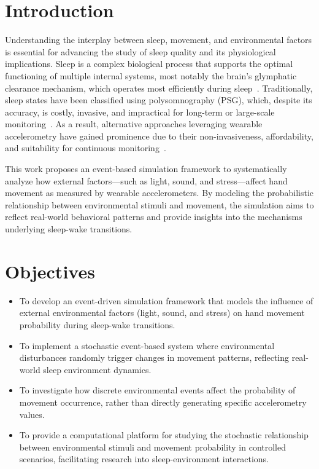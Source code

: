 \documentclass[conference]{IEEEtran}
\begin{document}
\section{Introduction}

Understanding the interplay between sleep, movement, and environmental factors is essential for advancing the study of sleep quality and its physiological implications. Sleep is a complex biological process that supports the optimal functioning of multiple internal systems, most notably the brain's glymphatic clearance mechanism, which operates most efficiently during sleep~\cite{Xie2013}. Traditionally, sleep states have been classified using polysomnography (PSG), which, despite its accuracy, is costly, invasive, and impractical for long-term or large-scale monitoring~\cite{Sadeh2011}. As a result, alternative approaches leveraging wearable accelerometry have gained prominence due to their non-invasiveness, affordability, and suitability for continuous monitoring~\cite{vanHees2015}.

This work proposes an event-based simulation framework to systematically analyze how external factors—such as light, sound, and stress—affect hand movement as measured by wearable accelerometers. By modeling the probabilistic relationship between environmental stimuli and movement, the simulation aims to reflect real-world behavioral patterns and provide insights into the mechanisms underlying sleep-wake transitions.

\section{Objectives}

\begin{itemize}
	\item To develop an event-driven simulation framework that models the influence of external environmental factors (light, sound, and stress) on hand movement probability during sleep-wake transitions.
	\item To implement a stochastic event-based system where environmental disturbances randomly trigger changes in movement patterns, reflecting real-world sleep environment dynamics.
	\item To investigate how discrete environmental events affect the probability of movement occurrence, rather than directly generating specific accelerometry values.
	\item To provide a computational platform for studying the stochastic relationship between environmental stimuli and movement probability in controlled scenarios, facilitating research into sleep-environment interactions.
\end{itemize}
\end{document}

